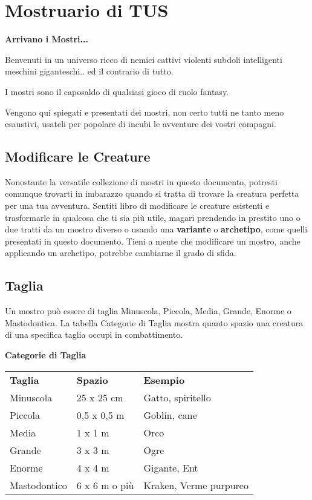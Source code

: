 \section{Mostruario di TUS}

\textbf{Arrivano i Mostri...}

Benvenuti in un universo ricco di nemici cattivi violenti subdoli intelligenti meschini giganteschi.. ed il contrario di tutto.

I mostri sono il caposaldo di qualsiasi gioco di ruolo fantasy.

Vengono qui spiegati e presentati dei mostri, non certo tutti ne tanto meno esaustivi, usateli per popolare di incubi le avventure dei vostri compagni.

\subsection{Modificare le Creature}

Nonostante la versatile collezione di mostri in questo documento, potresti comunque trovarti in imbarazzo quando si tratta di trovare la creatura perfetta per una tua avventura. Sentiti libro di modificare le creature esistenti e trasformarle in qualcosa che ti sia più utile, magari prendendo in prestito uno o due tratti da un mostro diverso o usando una \textbf{variante} o \textbf{archetipo}, come quelli presentati in questo documento. Tieni a mente che modificare un mostro, anche applicando un archetipo, potrebbe cambiarne il grado di sfida. 

\subsection{Taglia}

Un mostro può essere di taglia Minuscola, Piccola, Media, Grande, Enorme o Mastodontica. La tabella Categorie di Taglia mostra quanto spazio una creatura di una specifica taglia occupi in combattimento.

\medskip

\textbf{Categorie di Taglia}

\begin{tabular}{lll}
\toprule
\textbf{Taglia}& \textbf{Spazio} & \textbf{Esempio}\\
Minuscola & 25 x 25 cm& Gatto, spiritello\\
Piccola & 0,5 x 0,5 m & Goblin, cane\\
Media & 1 x 1 m & Orco\\
Grande & 3 x 3 m& Ogre\\
Enorme & 4 x 4 m & Gigante, Ent\\
Mastodontico & 6 x 6 m o più&Kraken, Verme purpureo\\
\end{tabular}

